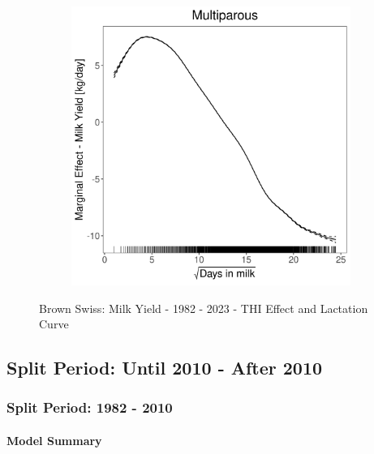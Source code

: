 \begin{figure}[H]
\begin{subfigure}[b]{0.45\textwidth}
    \end{subfigure}
    \hspace{0.05\textwidth} %
    \begin{subfigure}[b]{0.45\textwidth}
        \centering
        \includegraphics[width=\textwidth]{thesis/figures/models/milk/full/bs_milk_full/bs_milk_full_marginal_dim_milk_multi.png}
    \end{subfigure}
    \caption[]{Brown Swiss: Milk Yield - 1982 - 2023 - THI Effect and Lactation Curve}
    \label{fig:main}
\end{figure}

\subsection{Split Period: Until 2010 - After 2010}
\subsubsection{Split Period: 1982 - 2010}\label{model:bs_milk_before}
\paragraph{Model Summary} \quad \\

